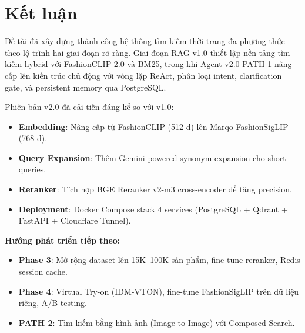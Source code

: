 \documentclass[12pt,a4paper]{report}
\begin{document}
\section{Kết luận}
Đề tài đã xây dựng thành công hệ thống tìm kiếm thời trang đa phương thức theo lộ trình hai giai đoạn rõ ràng. Giai đoạn RAG v1.0 thiết lập nền tảng tìm kiếm hybrid với FashionCLIP 2.0 và BM25, trong khi Agent v2.0 PATH 1 nâng cấp lên kiến trúc chủ động với vòng lặp ReAct, phân loại intent, clarification gate, và persistent memory qua PostgreSQL.

Phiên bản v2.0 đã cải tiến đáng kể so với v1.0:
\begin{itemize}
    \item \textbf{Embedding}: Nâng cấp từ FashionCLIP (512-d) lên Marqo-FashionSigLIP (768-d).
    \item \textbf{Query Expansion}: Thêm Gemini-powered synonym expansion cho short queries.
    \item \textbf{Reranker}: Tích hợp BGE Reranker v2-m3 cross-encoder để tăng precision.
    \item \textbf{Deployment}: Docker Compose stack 4 services (PostgreSQL + Qdrant + FastAPI + Cloudflare Tunnel).
\end{itemize}

\textbf{Hướng phát triển tiếp theo:}
\begin{itemize}
    \item \textbf{Phase 3}: Mở rộng dataset lên 15K--100K sản phẩm, fine-tune reranker, Redis session cache.
    \item \textbf{Phase 4}: Virtual Try-on (IDM-VTON), fine-tune FashionSigLIP trên dữ liệu riêng, A/B testing.
    \item \textbf{PATH 2}: Tìm kiếm bằng hình ảnh (Image-to-Image) với Composed Search.
\end{itemize}
\end{document}
